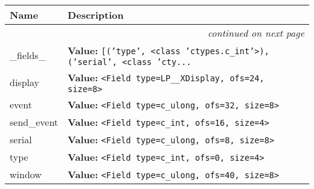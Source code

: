     \vspace{-1cm}
\hspace{\varindent}\begin{longtable}{|p{\varnamewidth}|p{\vardescrwidth}|l}
\cline{1-2}
\cline{1-2} \centering \textbf{Name} & \centering \textbf{Description}& \\
\cline{1-2}
\endhead\cline{1-2}\multicolumn{3}{r}{\small\textit{continued on next page}}\\\endfoot\cline{1-2}
\endlastfoot\raggedright \_\-f\-i\-e\-l\-d\-s\-\_\- & \raggedright \textbf{Value:} 
{\tt \texttt{[}\texttt{(}\texttt{'}\texttt{type}\texttt{'}\texttt{, }{\textless}class 'ctypes.c\_int'{\textgreater}\texttt{)}\texttt{, }\texttt{(}\texttt{'}\texttt{serial}\texttt{'}\texttt{, }{\textless}class 'cty\texttt{...}}&\\
\cline{1-2}
\raggedright d\-i\-s\-p\-l\-a\-y\- & \raggedright \textbf{Value:} 
{\tt {\textless}Field type=LP\_\_XDisplay, ofs=24, size=8{\textgreater}}&\\
\cline{1-2}
\raggedright e\-v\-e\-n\-t\- & \raggedright \textbf{Value:} 
{\tt {\textless}Field type=c\_ulong, ofs=32, size=8{\textgreater}}&\\
\cline{1-2}
\raggedright s\-e\-n\-d\-\_\-e\-v\-e\-n\-t\- & \raggedright \textbf{Value:} 
{\tt {\textless}Field type=c\_int, ofs=16, size=4{\textgreater}}&\\
\cline{1-2}
\raggedright s\-e\-r\-i\-a\-l\- & \raggedright \textbf{Value:} 
{\tt {\textless}Field type=c\_ulong, ofs=8, size=8{\textgreater}}&\\
\cline{1-2}
\raggedright t\-y\-p\-e\- & \raggedright \textbf{Value:} 
{\tt {\textless}Field type=c\_int, ofs=0, size=4{\textgreater}}&\\
\cline{1-2}
\raggedright w\-i\-n\-d\-o\-w\- & \raggedright \textbf{Value:} 
{\tt {\textless}Field type=c\_ulong, ofs=40, size=8{\textgreater}}&\\
\cline{1-2}
\end{longtable}



